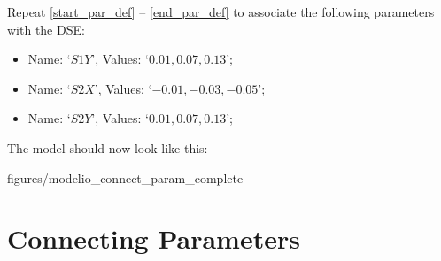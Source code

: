 \documentclass[11pt,a4paper]{../tutorial}
\begin{document}
\begin{instructions}
\newpage

\item Repeat \ref{start_par_def} -- \ref{end_par_def} to associate the following parameters with the DSE:
\begin{itemize}
	\item Name: `$S1Y$', Values: `$0.01, 0.07, 0.13$';
	\item Name: `$S2X$', Values: `$-0.01, -0.03, -0.05$';
	\item Name: `$S2Y$', Values: `$0.01, 0.07, 0.13$';
\end{itemize}

The model should now look like this:

\begin{center}
\begin{annotation}[width=0.7\linewidth]{figures/modelio_connect_param_complete}
    \end{annotation}
\end{center}

\end{instructions}



\newpage
\section{Connecting Parameters}
\end{document}
